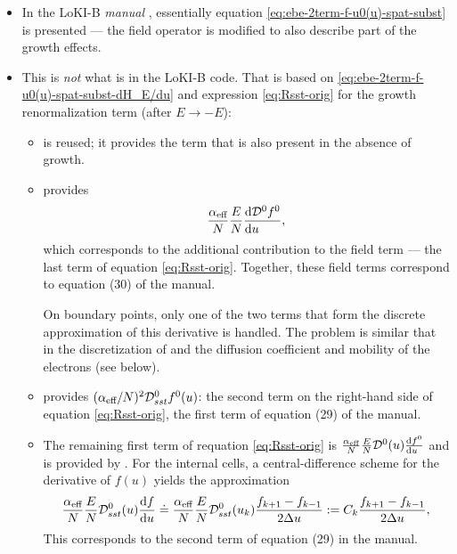 \documentclass{book}
\begin{document}
\begin{itemize}
\item In the LoKI-B {\em manual} \cite[eq. 8a--b,
	29--30c,32]{Manual_2_2_0}, essentially equation
	\eqref{eq:ebe-2term-f-u0(u)-spat-subst} is presented --- the field
	operator is modified to also describe part of the growth effects.
\item This is {\em not} what is in the LoKI-B code. That is based on
	\eqref{eq:ebe-2term-f-u0(u)-spat-subst-dH_E/du} and expression
	\eqref{eq:Rsst-orig} for the growth renormalization term
	(after $E\rightarrow -E$):
	\begin{itemize}
		\item {} is reused; it provides the term that is also present in the absence of growth.
		\item {} provides
		\[
			\frac{\alpha_{\text{eff}}}{N}\frac{E}{N}\DERIV{{\cal D}^0f^0}{u},
		\]
		which corresponds to the additional contribution to the field term --- the last term of
		equation \eqref{eq:Rsst-orig}. Together, these field terms correspond
		to equation (30) of the manual.
		\begin{framed}
			On boundary points, only one of the two terms that form the discrete
			approximation of this derivative is handled. The problem is similar
			that in the discretization of  and the diffusion
			coefficient and mobility of the electrons (see below).
		\end{framed}
		\item {} provides $(\alpha_{\text{eff}}/N)^2{\cal D}_{sst}^0f^0(u)$:
			the second term on the right-hand side of equation \eqref{eq:Rsst-orig},
			the first term of equation (29) of the manual.
		\item The remaining first term of requation \eqref{eq:Rsst-orig} is
			$\frac{\alpha_{\text{eff}}}{N}\frac{E}{N}{\cal D}^0(u)\DERIV{f^0}{u}$
			and is provided by .
			For the internal cells, a central-difference scheme for the derivative of $f(u)$ yields the approximation
			\begin{equation}
				\frac{\alpha_{\text{eff}}}{N}\frac{E}{N}{\cal D}_{sst}^0(u)\DERIV{f}{u}
				\doteq
				\frac{\alpha_{\text{eff}}}{N}\frac{E}{N}{\cal D}_{sst}^0(u_k)\frac{f_{k+1}-f_{k-1}}{2\Delta u}
				:=
				C_k\frac{f_{k+1}-f_{k-1}}{2\Delta u},
			\end{equation}
			This corresponds to the second term of equation (29) in the manual.


\end{itemize}
\end{itemize}
\end{document}
